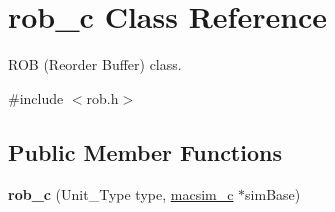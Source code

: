 \hypertarget{classrob__c}{
\section{rob\_\-c Class Reference}
\label{classrob__c}
}


ROB (Reorder Buffer) class.  




{\ttfamily \#include $<$rob.h$>$}

\subsection*{Public Member Functions}
\begin{DoxyCompactItemize}
\item 
\hypertarget{classrob__c_ac1fb29aba19dda5309209484c680cb21}{
{\bfseries rob\_\-c} (Unit\_\-Type type, \hyperlink{classmacsim__c}{macsim\_\-c} $\ast$simBase)}
\label{classrob__c_ac1fb29aba19dda5309209484c680cb21}


\end{DoxyCompactItemize}
